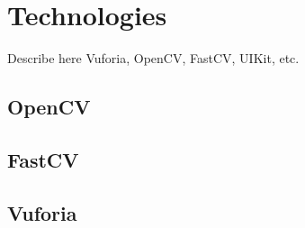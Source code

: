 \chapter{Technologies}
Describe here Vuforia, OpenCV, FastCV, UIKit, etc.
\section{OpenCV}
\section{FastCV}
\section{Vuforia}
